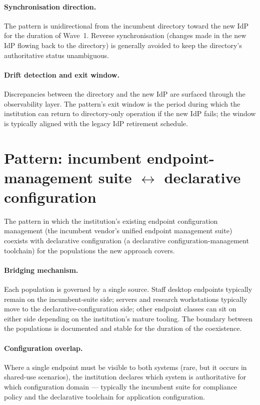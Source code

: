 \paragraph{Synchronisation direction.} The pattern is
unidirectional from the incumbent directory toward the new IdP for
the duration of Wave~1. Reverse synchronisation (changes made in
the new IdP flowing back to the directory) is generally avoided to
keep the directory's authoritative status unambiguous.

\paragraph{Drift detection and exit window.} Discrepancies
between the directory and the new IdP are surfaced through the
observability layer. The pattern's exit window is the period
during which the institution can return to directory-only
operation if the new IdP fails; the window is typically aligned
with the legacy IdP retirement schedule.

\section{Pattern: incumbent endpoint-management suite \texorpdfstring{$\leftrightarrow$}{<->} declarative configuration}
\label{sec:cp-sccm-ansible}

The pattern in which the institution's existing endpoint
configuration management (the incumbent vendor's unified endpoint
management suite) coexists with declarative configuration
(a declarative configuration-management toolchain) for
the populations the new approach covers.

\paragraph{Bridging mechanism.} Each population is governed by a
single source. Staff desktop endpoints typically remain on the
incumbent-suite side; servers and research workstations typically
move to the declarative-configuration side; other endpoint classes
can sit on either side depending on the institution's mature
tooling. The boundary between the populations is documented and
stable for the duration of the coexistence.

\paragraph{Configuration overlap.} Where a single endpoint must be
visible to both systems (rare, but it occurs in shared-use scenarios),
the institution declares which system is authoritative for which
configuration domain --- typically the incumbent suite for
compliance policy and the declarative toolchain for application
configuration.

